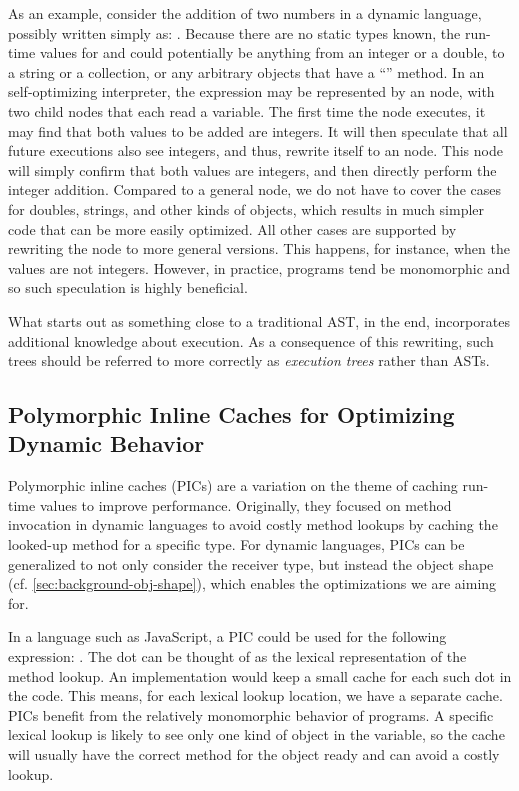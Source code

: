 As an example, consider the addition of two numbers in a dynamic language,
possibly written simply as: .
Because there are no static types known,
the run-time values for  and  could potentially be anything
from an integer or a double, to a string or a collection, or any
arbitrary objects that have a ``\code{+}'' method.
In an self-optimizing interpreter, the expression may be represented by
an  node, with two child nodes that each read a variable.
The first time the  node executes,
it may find that both values to be added are integers.
It will then speculate that all future executions
also see integers, and thus, rewrite itself to an  node.
This  node will simply confirm that both values are integers,
and then directly perform the integer addition.
Compared to a general  node,
we do not have to cover the cases for doubles, strings, and other kinds of objects,
which results in much simpler code that can be more easily optimized.
All other cases are supported by rewriting the  node to more general
versions.
This happens, for instance, when the values are not integers. 
However, in practice, programs tend be monomorphic and
so such speculation is highly beneficial.

What starts out as something close to a traditional AST,
in the end, incorporates additional knowledge about execution.
As a consequence of this rewriting, such trees should be referred
to more correctly as \emph{execution trees} rather than ASTs.


\subsection{Polymorphic Inline Caches for Optimizing Dynamic Behavior}
\label{sec:background-pics}

Polymorphic inline caches (PICs)\citep{Hoelzle:91:PIC}
are a variation on the theme of caching run-time values to improve performance.
Originally, they focused on method invocation in dynamic languages
to avoid costly method lookups by
caching the looked-up method for a specific type.
%
For dynamic languages,
PICs can be generalized to not only consider the receiver type,
but instead the object shape (cf. \cref{sec:background-obj-shape}),
which enables the optimizations we are aiming for.

In a language such as JavaScript,
a PIC could be used for the following expression:
.
The dot can be thought of as the lexical representation of the method lookup.
An implementation would keep a small cache for each such dot in the code.
This means, for each lexical lookup location, we have a separate cache.
PICs benefit from the relatively monomorphic behavior of programs.
A specific lexical lookup is likely to see only one kind of
object in the  variable, so the cache will usually have the
correct method for the object ready 
and can avoid a costly lookup.


